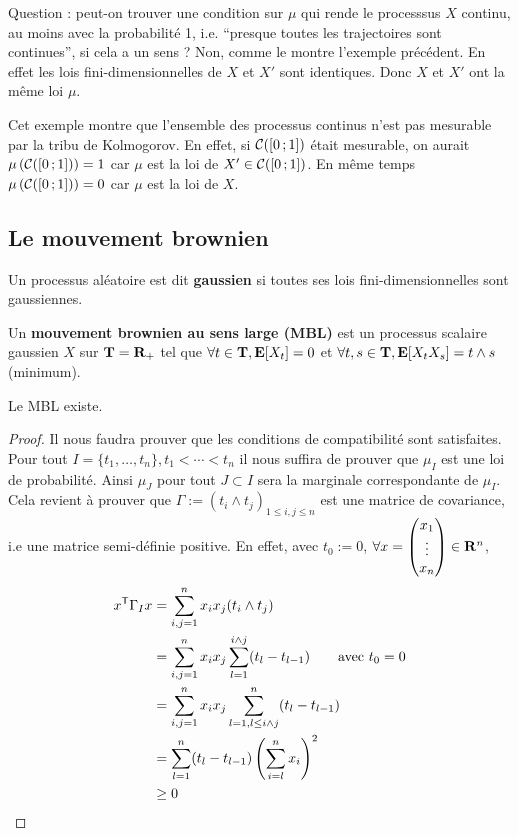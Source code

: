 	Question : peut-on trouver une condition sur $\mu$ qui rende le processsus $X$ continu, au moins avec la probabilité 1, i.e. “presque toutes les trajectoires sont continues”, si cela a un sens ?
	Non, comme le montre l'exemple précédent.
	En effet les lois fini-dimensionnelles de $X$ et $X'$ sont identiques.
	Donc $X$ et $X'$ ont la même loi $\mu$.
	
	Cet exemple montre que l'ensemble des processus continus n'est pas mesurable par la tribu de Kolmogorov.
	En effet, si $\mathcal{C}(\mathopen{[}0\mathclose{}\mathpunct{};1\mathclose{]})$ était mesurable, on aurait $\mu \left( \mathcal{C}(\mathopen{[}0\mathclose{}\mathpunct{};1\mathclose{]}) \right) = 1$ car $\mu$ est la loi de $X' \in \mathcal{C}(\mathopen{[}0\mathclose{}\mathpunct{};1\mathclose{]})$.
	En même temps $\mu \left( \mathcal{C}(\mathopen{[}0\mathclose{}\mathpunct{};1\mathclose{]}) \right) = 0$ car $\mu$ est la loi de $X$.


\subsection{Le mouvement brownien}

	\begin{defn}
		Un processus aléatoire est dit \textbf{gaussien} si toutes ses lois fini-dimensionnelles sont gaussiennes.
	\end{defn}
	
	\begin{defn}
		Un \textbf{mouvement brownien au sens large (MBL)} est un processus scalaire gaussien $X$ sur $\mathbf{T} = \mathbf{R}_+$ tel que $\forall t \in \mathbf{T}, \mathbf{E}[X_t] = 0$ et $\forall t,s \in \mathbf{T}, \mathbf{E}[X_t X_s] = t \wedge s$ (minimum).
	\end{defn}
	
	\begin{pop}
		Le MBL existe.
	\end{pop}
	
	\begin{proof}
		Il nous faudra prouver que les conditions de compatibilité sont satisfaites.
		Pour tout $I = \{ t_1,\ldots,t_n \}, t_1 < \cdots < t_n$ il nous suffira de prouver que $\mu_I$ est une loi de probabilité.
		Ainsi $\mu_J$ pour tout $J \subset I$ sera la marginale correspondante de $\mu_I$.
		Cela revient à prouver que $\Gamma := (t_i \wedge t_j)_{1 \leq i,j \leq n}$ est une matrice de covariance, i.e une matrice semi-définie positive.
		En effet, avec $t_0 := 0$, $\forall x = \begin{pmatrix} x_1 \\ \vdots \\ x_n \end{pmatrix} \in \mathbf{R}^n$,
		\begin{align*}
		x^\mathsf{T} \Gamma_I x & = \sum_{i,j = 1}^n x_i x_j (t_i \wedge t_j) \\
		                      & = \sum_{i,j = 1}^n x_i x_j \sum_{l = 1}^{i \wedge j} (t_l - t_{l - 1}) \qquad \text{avec}\ t_0 = 0 \\
		                      & = \sum_{i,j = 1}^n x_i x_j \sum_{l = 1, l \leq  i \wedge j}^{n} (t_l - t_{l - 1}) \\
		                      & = \sum_{l = 1}^n (t_l - t_{l - 1}) \left( \sum_{i = l}^n x_i \right)^2 \\
		                      & \geq 0
		\end{align*}
	\end{proof}
	

